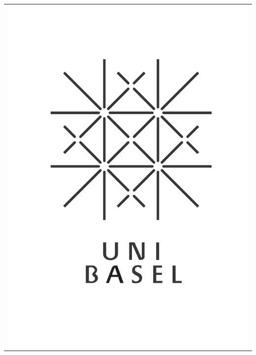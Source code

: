 \documentclass[landscape,a0paper,fontscale=0.292]{baposter}
\begin{document}
\begin{poster}
{\begin{tabular}{r}
    \includegraphics[height=0.12\textheight]{logo}\\
  \end{tabular}
 }



\end{poster}
\end{document}
